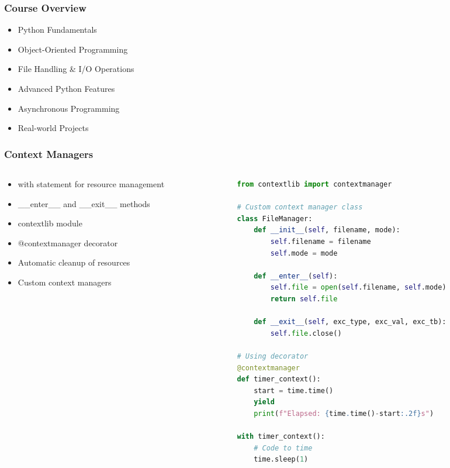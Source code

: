 \begin{frame}[fragile]\frametitle{Course Overview}

      \begin{itemize}
        \item Python Fundamentals
        \item Object-Oriented Programming
        \item File Handling \& I/O Operations
        \item Advanced Python Features
        \item Asynchronous Programming
        \item Real-world Projects
      \end{itemize}

\end{frame}

\begin{frame}[fragile]\frametitle{Context Managers}
\begin{columns}
    \begin{column}[T]{0.5\linewidth}
      \begin{itemize}
        \item with statement for resource management
        \item \_\_enter\_\_ and \_\_exit\_\_ methods
        \item contextlib module
        \item @contextmanager decorator
        \item Automatic cleanup of resources
        \item Custom context managers
      \end{itemize}
    \end{column}
    \begin{column}[T]{0.5\linewidth}
      \begin{lstlisting}[language=python, basicstyle=\tiny]
from contextlib import contextmanager

# Custom context manager class
class FileManager:
    def __init__(self, filename, mode):
        self.filename = filename
        self.mode = mode

    def __enter__(self):
        self.file = open(self.filename, self.mode)
        return self.file

    def __exit__(self, exc_type, exc_val, exc_tb):
        self.file.close()

# Using decorator
@contextmanager
def timer_context():
    start = time.time()
    yield
    print(f"Elapsed: {time.time()-start:.2f}s")

with timer_context():
    # Code to time
    time.sleep(1)
      \end{lstlisting}
    \end{column}
  \end{columns}
\end{frame}

